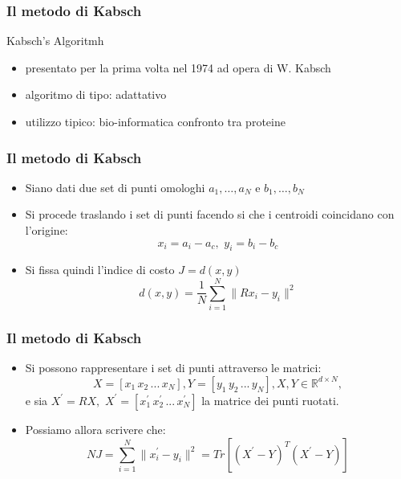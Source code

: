 \documentclass{beamer}
\begin{document}
\begin{frame}
\frametitle{Il metodo di Kabsch}
\begin{block}{Kabsch's Algoritmh}
	\begin{itemize}
		\item presentato per la prima volta nel 1974 ad opera di W. Kabsch
		\item algoritmo di tipo: adattativo
		\item utilizzo tipico: bio-informatica confronto tra proteine	
	\end{itemize}
\end{block}
\end{frame}

\begin{frame}
\frametitle{Il metodo di Kabsch}
\begin{itemize}
	\item Siano dati due set di punti omologhi $a_1, \dots, a_N$ e $b_1, \dots, b_N$
	\item Si procede traslando i set di punti facendo si che i centroidi coincidano con l'origine:
	\begin{equation}
	\label{rot:eq:redef}
	x_i = a_i - a_c, \, \, 
	y_i = b_i - b_c
	\end{equation}
	\item Si fissa quindi l'indice di costo $J = d(x, y)$
	\begin{equation}
	\label{rot:eq:dist}
	d(x, y) =  \frac{1}{N}\sum_{i = 1}^{N} \| R x_i - y_i \|^2
	\end{equation}	
\end{itemize}
\end{frame}

\begin{frame}
\frametitle{Il metodo di Kabsch}
\begin{itemize}
	\item Si possono rappresentare i set di punti attraverso le matrici:
	\begin{equation}
	X = [x_1 \, x_2 \, ... \, x_N], Y = [y_1 \, y_2 \, ... \, y_N], X, Y \in \mathbb{R}^{d \times N},
	\end{equation}
	e sia $X^{'} = RX, \, \, X^{'} = [x_1^{'} \, x_2^{'} \, ... \, x_N^{'}]$ la matrice dei punti ruotati.
	\item Possiamo allora scrivere che:
	\begin{equation}
	N J = \sum_{i = 1}^{N} \| x_i^{'} - y_i \|^2 = Tr[(X^{'} - Y)^{T}(X^{'} - Y)]
	\end{equation}
\end{itemize}
\end{frame}
\end{document}
